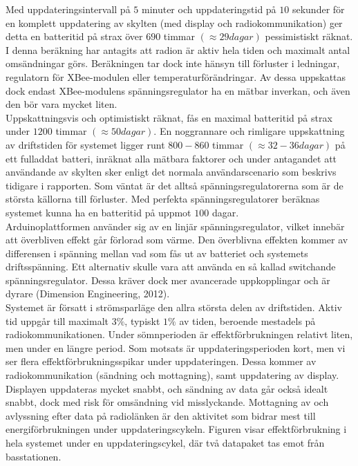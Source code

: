 \documentclass[a4paper,11pt]{article}
\begin{document}
Med uppdateringsintervall på $5$ minuter och uppdateringstid på $10$ sekunder för en komplett uppdatering av skylten (med display och radiokommunikation) ger detta en batteritid på strax över $690$ timmar $(\approx 29 dagar)$ pessimistiskt räknat. I denna beräkning har antagits att radion är aktiv hela tiden och maximalt antal omsändningar görs. Beräkningen tar dock inte hänsyn till förluster i ledningar, regulatorn för XBee-modulen eller temperaturförändringar. Av dessa uppskattas dock endast XBee-modulens spänningsregulator ha en mätbar inverkan, och även den bör vara mycket liten. \\

Uppskattningsvis och optimistiskt räknat, fås en maximal batteritid på strax under $1200$ timmar $(\approx 50 dagar)$. En noggrannare och rimligare uppskattning av driftstiden för systemet ligger runt $800-860$ timmar $(\approx 32-36 dagar)$ på ett fulladdat batteri, inräknat alla mätbara faktorer och under antagandet att användande av skylten sker enligt det normala användarscenario som beskrivs tidigare i rapporten. Som väntat är det alltså spänningsregulatorerna som är de största källorna till förluster. Med perfekta spänningsregulatorer beräknas systemet kunna ha en batteritid på uppmot $100$ dagar. \\

Arduinoplattformen använder sig av en linjär spänningsregulator, vilket innebär att överbliven effekt går förlorad som värme. Den överblivna effekten kommer av differensen i spänning mellan vad som fås ut av batteriet och systemets driftsspänning. Ett alternativ skulle vara att använda en så kallad switchande spänningsregulator. Dessa kräver dock mer avancerade uppkopplingar och är dyrare (Dimension Engineering, 2012). \\

Systemet är försatt i strömsparläge den allra största delen av driftstiden. Aktiv tid uppgår till maximalt $3\%$, typiskt $1\%$ av tiden, beroende mestadels på radiokommunikationen. Under sömnperioden är effektförbrukningen relativt liten, men under en längre period. Som motsats är uppdateringsperioden kort, men vi ser flera effektförbrukningsspikar under uppdateringen. Dessa kommer av radiokommunikation (sändning och mottagning), samt uppdatering av display. Displayen uppdateras mycket snabbt, och sändning av data går också idealt snabbt, dock med risk för omsändning vid misslyckande. Mottagning av och avlyssning efter data på radiolänken är den aktivitet som bidrar mest till energiförbrukningen under uppdateringscykeln. Figuren visar effektförbrukning i hela systemet under en uppdateringscykel, där två datapaket tas emot från basstationen.
\end{document}

